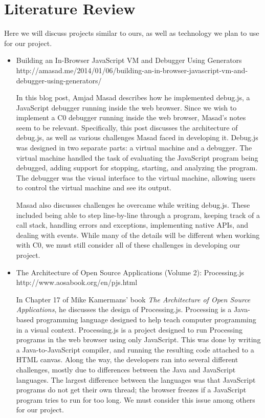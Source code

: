 \documentclass[11pt]{article}
\begin{document}
\section{Literature Review}
\par
Here we will discuss projects similar to ours, as well as technology
we plan to use for our project.
\begin{itemize}
\item Building an In-Browser JavaScript VM and Debugger Using Generators\\
  http://amasad.me/2014/01/06/building-an-in-browser-javascript-vm-and-debugger-using-generators/
  \par
  In this blog post, Amjad Masad describes how he implemented
  debug.js, a JavaScript debugger running inside the web
  browser. Since we wish to implement a C0 debugger running inside the
  web browser, Masad's notes seem to be relevant.  Specifically, this
  post discusses the architecture of debug.js, as well as various
  challenges Masad faced in developing it.  Debug.js was designed in
  two separate parts: a virtual machine and a debugger. The virtual
  machine handled the task of evaluating the JavaScript program being
  debugged, adding support for stopping, starting, and analyzing the
  program. The debugger was the visual interface to the virtual
  machine, allowing users to control the virtual machine and see its
  output.
  \par
  Masad also discusses challenges he overcame while writing
  debug.js. These included being able to step line-by-line through a
  program, keeping track of a call stack, handling errors and
  exceptions, implementing native APIs, and dealing with events. While
  many of the details will be different when working with C0, we must
  still consider all of these challenges in developing our project.

\item The Architecture of Open Source Applications (Volume 2): Processing.js\\
  http://www.aosabook.org/en/pjs.html
  \par
  In Chapter 17 of Mike Kamermans' book {\it The Architecture of Open
  Source Applications}, he discusses the design of
  Processing.js. Processing is a Java-based programming language
  designed to help teach computer programming in a visual
  context. Processing.js is a project designed to run Processing
  programs in the web browser using only JavaScript.  This was done by
  writing a Java-to-JavaScript compiler, and running the resulting
  code attached to a HTML canvas.  Along the way, the developers ran
  into several different challenges, mostly due to differences between
  the Java and JavaScript languages.  The largest difference between
  the languages was that JavaScript programs do not get their own
  thread; the browser freezes if a JavaScript program tries to run for
  too long.  We must consider this issue among others for our project.


\end{itemize}
\end{document}
